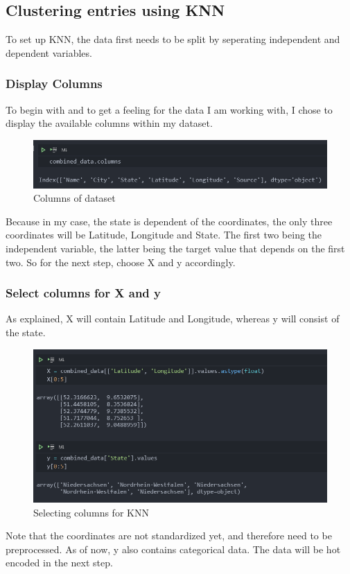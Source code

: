 \subsection{Clustering entries using KNN}
To set up KNN, the data first needs to be split by seperating independent and dependent variables.
\subsubsection{Display Columns}
To begin with and to get a feeling for the data I am working with, I chose to display the available columns within my dataset.
\begin{figure}[H]
	\includegraphics[width=\textwidth]{Bilder/display_columns.PNG}
	\caption{Columns of dataset}
\end{figure}
Because in my case, the state is dependent of the coordinates, the only three coordinates will be Latitude, Longitude and State. The first two being the independent variable, the latter being the target value that depends on the first two. So for the next step, choose X and y accordingly.
\subsubsection{Select columns for X and y}
As explained, X will contain Latitude and Longitude, whereas y will consist of the state.
\begin{figure}[H]
	\includegraphics[width=\textwidth]{Bilder/select_columns.PNG}
	\caption{Selecting columns for KNN}
\end{figure}
Note that the coordinates are not standardized yet, and therefore need to be preprocessed. As of now, y also contains categorical data. The data will be hot encoded in the next step.
